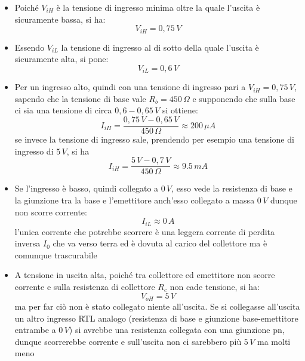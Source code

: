 \documentclass[12pt, a4paper]{report}
\begin{document}
\begin{itemize}
    \item Poiché $V_{iH}$ è la tensione di ingresso minima oltre la quale l'uscita è sicuramente bassa, si ha:
    \begin{equation}
        V_{iH} = 0,75\,V
        \label{v_ih_not}
    \end{equation}
    \item Essendo $V_{iL}$ la tensione di ingresso al di sotto della quale l'uscita è sicuramente alta, si pone:
    \begin{equation}
        V_{iL} = 0,6\,V
    \end{equation}
    \item Per un ingresso alto, quindi con una tensione di ingresso pari a $V_{iH} = 0,75\,V$, sapendo che la tensione di base vale $R_{b} = 450\,\Omega$ e supponendo che sulla base ci sia una tensione di circa $0,6 - 0,65\,V$ si ottiene:
    \begin{equation}
        I_{iH} = \frac{0,75\,V - 0,65\,V}{450\,\Omega} \approx 200\,\mu A
        \label{i_ih_not}
    \end{equation}
    se invece la tensione di ingresso sale, prendendo per esempio una tensione di ingresso di $5\,V$, si ha
    \begin{equation*}
        I_{iH} = \frac{5\,V - 0,7\,V}{450\,\Omega} \approx 9.5\,mA
    \end{equation*}
    \item Se l'ingresso è basso, quindi collegato a $0\,V$, esso vede la resistenza di base e la giunzione tra la base e l'emettitore anch'esso collegato a massa $0\,V$ dunque non scorre corrente:
    \begin{equation}
        I_{iL} \approx 0\,A
        \label{i_il_not}
    \end{equation}
    l'unica corrente che potrebbe scorrere è una leggera corrente di perdita inversa $I_{0}$ che va verso terra ed è dovuta al carico del collettore ma è comunque trascurabile
    \item A tensione in uscita alta, poiché tra collettore ed emettitore non scorre corrente e sulla resistenza di collettore $R_c$ non cade tensione, si ha:
    \begin{equation}
        V_{oH} = 5\,V
        \label{v_oh_not}
    \end{equation}
    ma per far ciò non è stato collegato niente all'uscita. Se si collegasse all'uscita un altro ingresso RTL analogo (resistenza di base e giunzione base-emettitore entrambe a $0\,V$) si avrebbe una resistenza collegata con una giunzione pn, dunque scorrerebbe corrente e sull'uscita non ci sarebbero più $5\,V$ ma molti meno

\end{itemize}
\end{document}

